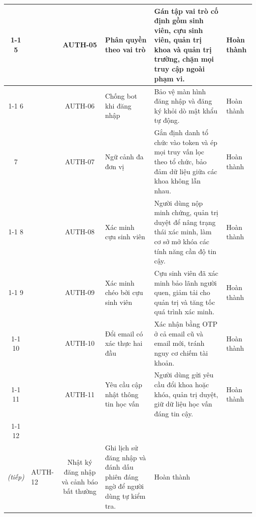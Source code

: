 \documentclass[12pt,a4paper,oneside]{report}
\begin{document}
\begin{landscape}
\begin{longtable}{|c|>{\raggedright\arraybackslash}p{3.1cm}|c|>{\raggedright\arraybackslash}p{4.6cm}|>{\raggedright\arraybackslash}p{8.4cm}|>{\raggedright\arraybackslash}p{2.4cm}|}
\cline{1-1}\cline{3-6}
\cellcolor{oldrow}5 & \cellcolor{oldrow} & \cellcolor{oldrow}AUTH-05 & \cellcolor{oldrow}Phân quyền theo vai trò & \cellcolor{oldrow}Gán tập vai trò cố định gồm sinh viên, cựu sinh viên, quản trị khoa và quản trị trường, chặn mọi truy cập ngoài phạm vi. & \cellcolor{oldrow}Hoàn thành \\
\cline{1-1}\cline{3-6}
\cellcolor{oldrow}6 & \multirow{-6}{2.4cm}{\cellcolor{oldrow}\textbf{Xác thực, phân quyền}} & \cellcolor{oldrow}AUTH-06 & \cellcolor{oldrow}Chống bot khi đăng nhập & \cellcolor{oldrow}Bảo vệ màn hình đăng nhập và đăng ký khỏi dò mật khẩu tự động. & \cellcolor{oldrow}Hoàn thành \\
\hline
\cellcolor{oldrow}7 & \cellcolor{oldrow} & \cellcolor{oldrow}AUTH-07 & \cellcolor{oldrow}Ngữ cảnh đa đơn vị & \cellcolor{oldrow}Gắn định danh tổ chức vào token và ép mọi truy vấn lọc theo tổ chức, bảo đảm dữ liệu giữa các khoa không lẫn nhau. & \cellcolor{oldrow}Hoàn thành \\
\cline{1-1}\cline{3-6}
\cellcolor{oldrow}8 & \cellcolor{oldrow} & \cellcolor{oldrow}AUTH-08 & \cellcolor{oldrow}Xác minh cựu sinh viên & \cellcolor{oldrow}Người dùng nộp minh chứng, quản trị duyệt để nâng trạng thái xác minh, làm cơ sở mở khóa các tính năng cần độ tin cậy. & \cellcolor{oldrow}Hoàn thành \\
\cline{1-1}\cline{3-6}
\cellcolor{oldrow}9 & \cellcolor{oldrow} & \cellcolor{oldrow}AUTH-09 & \cellcolor{oldrow}Xác minh chéo bởi cựu sinh viên & \cellcolor{oldrow}Cựu sinh viên đã xác minh bảo lãnh người quen, giảm tải cho quản trị và tăng tốc quá trình xác minh. & \cellcolor{oldrow}Hoàn thành \\
\cline{1-1}\cline{3-6}
\cellcolor{oldrow}10 & \cellcolor{oldrow} & \cellcolor{oldrow}AUTH-10 & \cellcolor{oldrow}Đổi email có xác thực hai đầu & \cellcolor{oldrow}Xác nhận bằng OTP ở cả email cũ và email mới, tránh nguy cơ chiếm tài khoản. & \cellcolor{oldrow}Hoàn thành \\
\cline{1-1}\cline{3-6}
\cellcolor{oldrow}11 & \cellcolor{oldrow} & \cellcolor{oldrow}AUTH-11 & \cellcolor{oldrow}Yêu cầu cập nhật thông tin học vấn & \cellcolor{oldrow}Người dùng gửi yêu cầu đổi khoa hoặc khóa, quản trị duyệt, giữ dữ liệu học vấn đáng tin cậy. & \cellcolor{oldrow}Hoàn thành \\
\cline{1-1}\cline{3-6}
\cellcolor{oldrow}12 & \multirow{-6}{2.4cm}{\cellcolor{oldrow}\textbf{Xác thực, phân quyền\\\textit{(tiếp)}}} & \cellcolor{oldrow}AUTH-12 & \cellcolor{oldrow}Nhật ký đăng nhập và cảnh báo bất thường & \cellcolor{oldrow}Ghi lịch sử đăng nhập và đánh dấu phiên đáng ngờ để người dùng tự kiểm tra. & \cellcolor{oldrow}Hoàn thành \\

\end{longtable}
\end{landscape}
\end{document}
